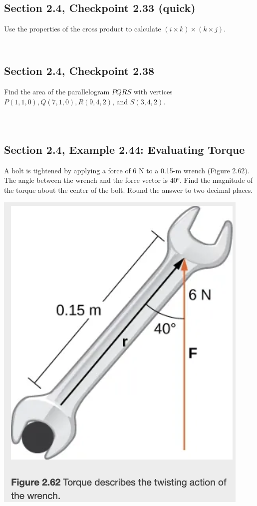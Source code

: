 \documentclass[]{mangos-musings}
\begin{document}
\subsection{Section 2.4, Checkpoint 2.33 (quick)}
Use the properties of the cross product to calculate $(i\times k)\times(k\times j)$.
\begin{align*}
  \\ 
  \\ 
  \\ 
  \\
\end{align*}
\subsection{Section 2.4, Checkpoint 2.38}
Find the area of the parallelogram $PQRS$ with vertices $P(1,1,0),Q(7,1,0),R(9,4,2)$, and $S(3,4,2)$.
\begin{align*}
  \\ 
  \\ 
  \\ 
  \\
  \\
  \\
\end{align*}

\subsection{Section 2.4, Example 2.44: Evaluating Torque}
A bolt is tightened by applying a force of 6 N to a 0.15-m wrench (Figure 2.62). The angle between the wrench and the force vector is 40°. Find the magnitude of the torque about the center of the bolt. Round the answer to two decimal places.

\includegraphics[scale=0.8]{assets/rec02-fig-2.62.png}
\end{document}

